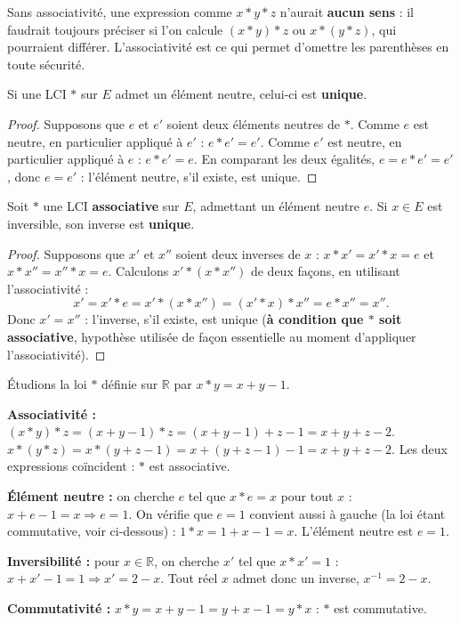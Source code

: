 \documentclass[a4paper,12pt,openany]{book}
\begin{document}
\begin{remarque}
Sans associativité, une expression comme $x*y*z$ n'aurait \textbf{aucun
sens} : il faudrait toujours préciser si l'on calcule $(x*y)*z$ ou
$x*(y*z)$, qui pourraient différer. L'associativité est ce qui permet
d'omettre les parenthèses en toute sécurité.
\end{remarque}

\begin{theoreme}
Si une LCI $*$ sur $E$ admet un élément neutre, celui-ci est \textbf{unique}.
\end{theoreme}

\begin{proof}
Supposons que $e$ et $e'$ soient deux éléments neutres de $*$. Comme $e$
est neutre, en particulier appliqué à $e'$ : $e*e' = e'$. Comme $e'$ est
neutre, en particulier appliqué à $e$ : $e*e' = e$. En comparant les deux
égalités, $e=e*e'=e'$, donc $e=e'$ : l'élément neutre, s'il existe, est
unique.
\end{proof}

\begin{theoreme}
Soit $*$ une LCI \textbf{associative} sur $E$, admettant un élément neutre
$e$. Si $x\in E$ est inversible, son inverse est \textbf{unique}.
\end{theoreme}

\begin{proof}
Supposons que $x'$ et $x''$ soient deux inverses de $x$ : $x*x'=x'*x=e$ et
$x*x''=x''*x=e$. Calculons $x'*(x*x'')$ de deux façons, en utilisant
l'associativité :
\[
x' = x'*e = x'*(x*x'') = (x'*x)*x'' = e*x'' = x''.
\]
Donc $x'=x''$ : l'inverse, s'il existe, est unique (\textbf{à condition que
$*$ soit associative}, hypothèse utilisée de façon essentielle au moment
d'appliquer l'associativité).
\end{proof}


\begin{exemple}[4.3]
Étudions la loi $*$ définie sur $\mathbb{R}$ par $x*y = x+y-1$.

\textbf{Associativité :} $(x*y)*z = (x+y-1)*z = (x+y-1)+z-1 = x+y+z-2$.
$x*(y*z) = x*(y+z-1) = x+(y+z-1)-1 = x+y+z-2$. Les deux expressions
coïncident : $*$ est associative.

\textbf{Élément neutre :} on cherche $e$ tel que $x*e=x$ pour tout $x$ :
$x+e-1=x \Rightarrow e=1$. On vérifie que $e=1$ convient aussi à gauche
(la loi étant commutative, voir ci-dessous) : $1*x=1+x-1=x$. L'élément
neutre est $e=1$.

\textbf{Inversibilité :} pour $x\in\mathbb{R}$, on cherche $x'$ tel que
$x*x'=1$ : $x+x'-1=1 \Rightarrow x'=2-x$. Tout réel $x$ admet donc un
inverse, $x^{-1}=2-x$.

\textbf{Commutativité :} $x*y=x+y-1=y+x-1=y*x$ : $*$ est commutative.
\end{exemple}
\end{document}
